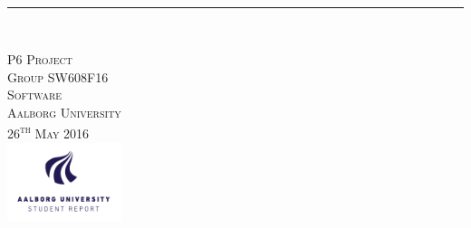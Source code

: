 \thispagestyle{empty}
\begin{flushright}
\vspace{3cm}

\phantom{hul}

\phantom{hul}

\phantom{hul}

\textsl{\Huge \name{}} \\ \vspace{1cm}

\rule{13cm}{3mm} \\ %
\end{flushright}

\begin{center}
\end{center}
\begin{flushright}
\vspace{2cm}
\textsc{\Large P6 Project \\
Group SW608F16 \\
Software\\
Aalborg University\\
26\textsuperscript{th} May 2016\\
\includegraphics[width=0.25\textwidth]{graphics/AAU-logo-stud-UK-RGB.pdf}}
\end{flushright}